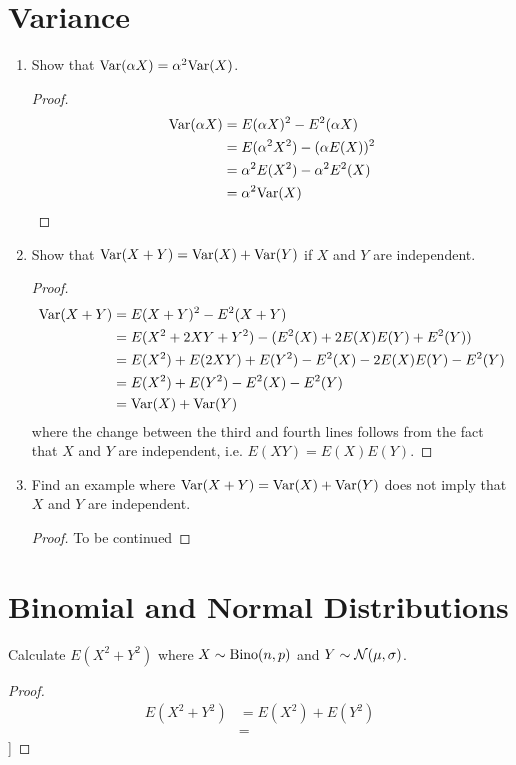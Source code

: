 \documentclass{article}
\begin{document}
\section{Variance}
    \begin{enumerate}[label=\roman*)]
        \item Show that $\text{Var}(\alpha X) = \alpha^2\text{Var}(X)$.  
            \begin{proof}
                \begin{align*}
                    \text{Var}(\alpha X) &= E(\alpha X)^2 - E^2(\alpha X)\\
                    &= E(\alpha^2X^2) - (\alpha E(X))^2\\
                    &= \alpha^2E(X^2) - \alpha^2 E^2(X)\\
                    &= \alpha^2\text{Var}(X)
                \end{align*}
            \end{proof}
        \item Show that $\text{Var}(X + Y) = \text{Var}(X) + \text{Var}(Y)$ if $X$ and $Y$ are
        independent.
            \begin{proof}
                \begin{align*}
                    \text{Var}(X + Y) &= E(X + Y)^2 - E^2(X + Y)\\
                    &= E(X^2 + 2XY + Y^2) - (E^2(X) + 2E(X)E(Y) + E^2(Y))\\
                    &= E(X^2) + E(2XY) + E(Y^2) - E^2(X) - 2E(X)E(Y) - E^2(Y)\\
                    &= E(X^2) + E(Y^2) - E^2(X) - E^2(Y)\\
                    &= \text{Var}(X) + \text{Var}(Y)
                \end{align*} 
                where the change between the third and fourth lines follows from
                the fact that $X$ and $Y$ are independent, i.e. $E(XY) =
                E(X)E(Y)$.
            \end{proof}
        \item Find an example where $\text{Var}(X + Y) = \text{Var}(X) + \text{Var}(Y)$ does not
        imply that $X$ and $Y$ are independent. 
            \begin{proof}
                To be continued
            \end{proof}
    \end{enumerate}

\section{Binomial and Normal Distributions}
    Calculate $E(X^2 + Y^2)$ where $X \sim \text{Bino}(n, p)$ and $Y \sim
    \mathcal{N}(\mu,\sigma)$. 
    \begin{proof}
        \begin{align*}
            E(X^2 + Y^2) &= E(X^2) + E(Y^2)\\
            &= 
        \end{align*}
    ]\end{proof}
\end{document}
